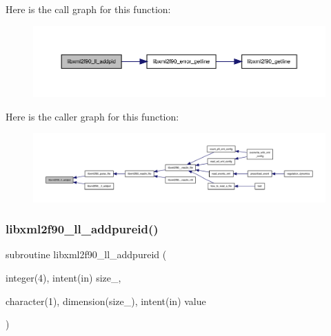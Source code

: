 Here is the call graph for this function\+:
\nopagebreak
\begin{figure}[H]
\begin{center}
\leavevmode
\includegraphics[width=350pt]{libxml2f90_8f90__pp_8f90_a844ec38349c1e4d4537237258b453eda_cgraph}
\end{center}
\end{figure}
Here is the caller graph for this function\+:
\nopagebreak
\begin{figure}[H]
\begin{center}
\leavevmode
\includegraphics[width=350pt]{libxml2f90_8f90__pp_8f90_a844ec38349c1e4d4537237258b453eda_icgraph}
\end{center}
\end{figure}
\mbox{\label{libxml2f90_8f90__pp_8f90_a339be1907542e3618239cb185bd5c386}} 
\subsubsection{\texorpdfstring{libxml2f90\+\_\+ll\+\_\+addpureid()}{libxml2f90\_ll\_addpureid()}}
{\footnotesize\ttfamily subroutine libxml2f90\+\_\+ll\+\_\+addpureid (\begin{DoxyParamCaption}\item[{integer(4), intent(in)}]{size\+\_\+,  }\item[{character(1), dimension(size\+\_\+), intent(in)}]{value }\end{DoxyParamCaption})}

